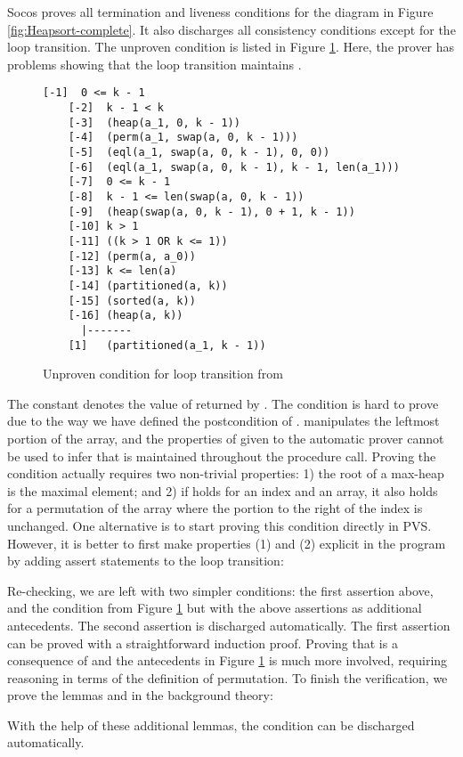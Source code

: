 \documentclass[english,submission]{eptcs}
\begin{document}
Socos proves all termination and liveness conditions for the diagram
in Figure \ref{fig:Heapsort-complete}. It also discharges all consistency
conditions except for the  loop transition. The
unproven condition is listed in Figure \ref{fig:Unproved-condition-Loop}.
Here, the prover has problems showing that the loop transition maintains
. 
\begin{figure}
\begin{lstlisting}[basicstyle={\small\ttfamily},frame=lines]
    [-1]  0 <= k - 1
    [-2]  k - 1 < k
    [-3]  (heap(a_1, 0, k - 1))
    [-4]  (perm(a_1, swap(a, 0, k - 1)))
    [-5]  (eql(a_1, swap(a, 0, k - 1), 0, 0))
    [-6]  (eql(a_1, swap(a, 0, k - 1), k - 1, len(a_1)))
    [-7]  0 <= k - 1
    [-8]  k - 1 <= len(swap(a, 0, k - 1))
    [-9]  (heap(swap(a, 0, k - 1), 0 + 1, k - 1))
    [-10] k > 1
    [-11] ((k > 1 OR k <= 1))
    [-12] (perm(a, a_0))
    [-13] k <= len(a)
    [-14] (partitioned(a, k))
    [-15] (sorted(a, k))
    [-16] (heap(a, k))
      |-------
    [1]   (partitioned(a_1, k - 1))
\end{lstlisting}
\caption{Unproven condition for loop transition from  \label{fig:Unproved-condition-Loop}}
\end{figure}
The constant  denotes the value of 
returned by . The condition is hard to prove due to
the way we have defined the postcondition of .
 manipulates the leftmost portion of the array, and
the properties of  given to the automatic prover cannot
be used to infer that  is maintained throughout
the procedure call. Proving the condition actually requires two
non-trivial properties: 1) the root of a max-heap is the maximal
element; and 2) if  holds for an index and an
array, it also holds for a permutation of the array where the portion
to the right of the index is unchanged.  One alternative is to start
proving this condition directly in PVS.  However, it is better to
first make properties (1) and (2) explicit in the program by adding
assert statements to the loop transition:
\begin{quote}

\end{quote}
Re-checking, we are left with two simpler conditions:
the first assertion above, and the condition from Figure
\ref{fig:Unproved-condition-Loop} but with the above assertions as
additional antecedents. The second assertion is discharged
automatically. The first assertion can be proved with a
straightforward induction proof. Proving that
 is a consequence of
 and the antecedents in
Figure \ref{fig:Unproved-condition-Loop} is much more involved,
requiring reasoning in terms of the definition of permutation. To
finish the verification, we prove the lemmas 
and  in the background theory:
\begin{quote}

\end{quote}
With the help of these additional lemmas, the condition can be 
discharged automatically.
\end{document}
